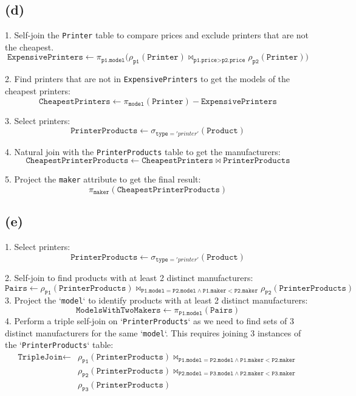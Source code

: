 \documentclass{article}
\begin{document}
\newpage
\subsection*{(d)}
1. Self-join the \texttt{Printer} table to compare prices and exclude printers that are not the cheapest.
$$
    \texttt{ExpensivePrinters} \leftarrow \pi_{\texttt{p1.model}} \Big(
    \rho_{\texttt{p1}}(\texttt{Printer}) \bowtie_{\texttt{p1.price} > \texttt{p2.price}} \rho_{\texttt{p2}}(\texttt{Printer})
    \Big)
$$

2. Find printers that are not in \texttt{ExpensivePrinters} to get the models of the cheapest printers:
$$
    \texttt{CheapestPrinters} \leftarrow \pi_{\texttt{model}}(\texttt{Printer}) - \texttt{ExpensivePrinters}
$$

3. Select printers:
$$
    \texttt{PrinterProducts} \leftarrow \sigma_{\texttt{type} = 'printer'}(\texttt{Product})
$$

4. Natural join with the \texttt{PrinterProducts} table to get the manufacturers:
$$
    \texttt{CheapestPrinterProducts} \leftarrow \texttt{CheapestPrinters} \bowtie \texttt{PrinterProducts}
$$

5. Project the \texttt{maker} attribute to get the final result:
$$
    \pi_{\texttt{maker}}(\texttt{CheapestPrinterProducts})
$$

\subsection*{(e)}
1. Select printers:
$$
    \texttt{PrinterProducts} \leftarrow \sigma_{\texttt{type} = 'printer'}(\texttt{Product})
$$

2. Self-join to find products with at least 2 distinct manufacturers:
$$
    \texttt{Pairs} \leftarrow \rho_{\texttt{P1}}(\texttt{PrinterProducts}) \bowtie_{\texttt{P1.model} = \texttt{P2.model} \land \texttt{P1.maker} < \texttt{P2.maker}} \rho_{\texttt{P2}}(\texttt{PrinterProducts})
$$
3. Project the `\texttt{model}` to identify products with at least 2 distinct manufacturers:
$$
    \texttt{ModelsWithTwoMakers} \leftarrow \pi_{\texttt{P1.model}}(\texttt{Pairs})
$$
4. Perform a triple self-join on `\texttt{PrinterProducts}` as we need to find sets of 3 distinct manufacturers for the same `\texttt{model}`. This requires joining 3 instances of the `\texttt{PrinterProducts}` table:
$$
    \begin{aligned}
        \texttt{TripleJoin} \leftarrow
         & \rho_{\texttt{P1}}(\texttt{PrinterProducts})
        \bowtie_{\texttt{P1.model} = \texttt{P2.model} \land \texttt{P1.maker} < \texttt{P2.maker}} \\
         & \rho_{\texttt{P2}}(\texttt{PrinterProducts})
        \bowtie_{\texttt{P2.model} = \texttt{P3.model} \land \texttt{P2.maker} < \texttt{P3.maker}} \\
         & \rho_{\texttt{P3}}(\texttt{PrinterProducts})
    \end{aligned}
$$
\end{document}
